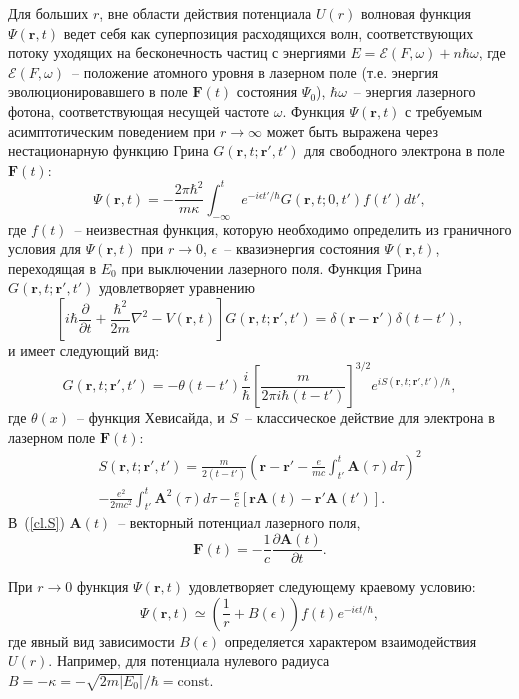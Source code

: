 \documentclass[14pt]{extarticle}
\newcommand{\vF}{\mathbf{F}}
\newcommand{\vA}{\mathbf{A}}
\newcommand{\vr}{\mathbf{r}}
\newcommand{\cE}{\mathcal{E}}
\begin{document}
Для больших $r$, вне области действия потенциала $U(r)$ волновая функция $\Psi(\vr,t)$ ведет себя как суперпозиция расходящихся волн, соответствующих потоку уходящих на бесконечность частиц с энергиями $E=\cE(F,\omega)+n\hbar\omega$, где $\cE(F,\omega)$~-- положение атомного уровня в лазерном поле (т.е. энергия эволюционировавшего в поле $\vF(t)$ состояния $\Psi_0$), $\hbar\omega$~-- энергия лазерного фотона,  соответствующая несущей частоте $\omega$. Функция $\Psi(\vr,t)$ с требуемым асимптотическим поведением при $r\to\infty$ может быть выражена через нестационарную функцию Грина $G(\vr,t;\vr',t')$ для свободного электрона в поле $\vF(t)$:
\begin{equation}
\label{Psi:int}
\Psi(\vr,t) = -\frac{2\pi\hbar^2}{m\kappa}\int_{-\infty}^t
e^{-i\epsilon t'/\hbar} G(\vr,t;0,t')f(t')dt',
\end{equation}
где $f(t)$~-- неизвестная функция, которую необходимо определить из граничного условия для $\Psi(\vr,t)$ при $r\to 0$, $\epsilon$~-- квазиэнергия состояния $\Psi(\vr,t)$, переходящая в $E_0$ при выключении лазерного поля. Функция Грина $G(\vr,t;\vr',t')$ удовлетворяет уравнению
\begin{equation}
\label{Eq:Green}
\left[i\hbar\frac{\partial}{\partial t} + \frac{\hbar^2}{2m}\nabla^2  - V(\vr,t)\right]G(\vr,t;\vr',t') = \delta(\vr-\vr')\delta(t-t'),
\end{equation}
и имеет следующий вид:
\begin{equation}
\label{Green}
G(\vr,t;\vr',t') = -\theta(t-t')\frac{i}{\hbar}\left[\frac{m}{2\pi i\hbar(t-t')}\right]^{3/2}e^{iS(\vr,t;\vr',t')/\hbar},
\end{equation}
где $\theta(x)$~-- функция Хевисайда, и $S$~-- классическое действие для электрона в лазерном поле $\vF(t)$:
\begin{eqnarray}
S(\vr,t;\vr',t') = \frac{m}{2(t-t')}\left( \vr-\vr' -\frac{e}{mc}\int_{t'}^t\vA(\tau)d\tau \right)^2 \nonumber \\ 
-\frac{e^2}{2mc^2}\int_{t'}^t\vA^2(\tau)d\tau 
- \frac{e}{c}[\vr\vA(t)-\vr'\vA(t')].
\label{cl.S}
\end{eqnarray}
В~(\ref{cl.S}) $\vA(t)$~-- векторный потенциал лазерного поля,
\begin{equation}
\label{F-A}
\vF(t) = -\frac{1}{c}\frac{\partial\vA(t)}{\partial t}.
\end{equation}

При $r\to 0$ функция $\Psi(\vr,t)$ удовлетворяет следующему краевому условию:
\begin{equation}
\label{BC}
\Psi(\vr,t)\simeq \left(\frac{1}{r}+B(\epsilon)\right)f(t)e^{-i\epsilon t/\hbar},
\end{equation}
где явный вид зависимости $B(\epsilon)$ определяется характером взаимодействия $U(r)$. Например, для потенциала нулевого радиуса $B=-\kappa=-\sqrt{2m|E_0|}/\hbar=\mathrm{const}$.
\end{document}
